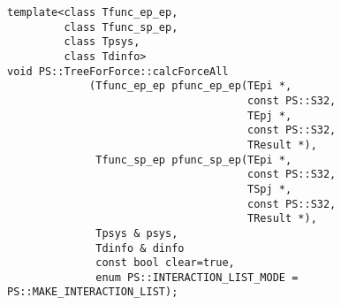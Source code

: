 \begin{screen}
\begin{verbatim}
template<class Tfunc_ep_ep,
         class Tfunc_sp_ep,
         class Tpsys,
         class Tdinfo>
void PS::TreeForForce::calcForceAll
             (Tfunc_ep_ep pfunc_ep_ep(TEpi *,
                                      const PS::S32,
                                      TEpj *,
                                      const PS::S32,
                                      TResult *),
              Tfunc_sp_ep pfunc_sp_ep(TEpi *,
                                      const PS::S32,
                                      TSpj *,
                                      const PS::S32,
                                      TResult *),
              Tpsys & psys,
              Tdinfo & dinfo
              const bool clear=true,
              enum PS::INTERACTION_LIST_MODE = PS::MAKE_INTERACTION_LIST);
\end{verbatim}
\end{screen}

